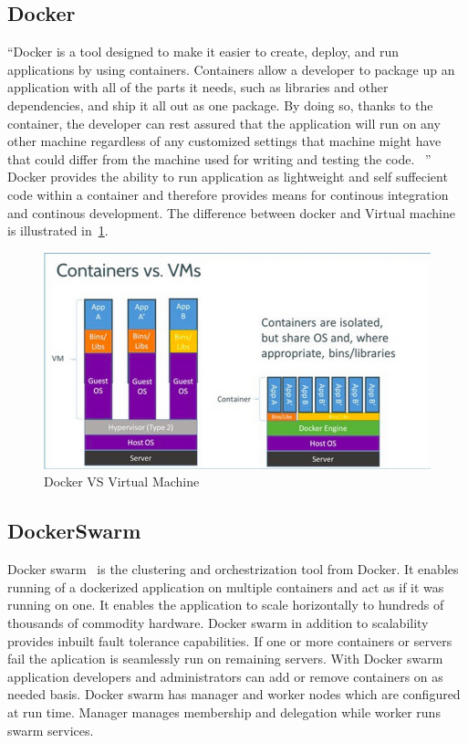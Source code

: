 \subsection{Docker}

``Docker is a tool designed to make it easier to create, deploy, and
run applications by using containers. Containers allow a developer to
package up an application with all of the parts it needs, such as
libraries and other dependencies, and ship it all out as one
package. By doing so, thanks to the container, the developer can rest
assured that the application will run on any other machine regardless
of any customized settings that machine might have that could differ
from the machine used for writing and testing the
code. ~\cite{hid-sp18-413-docker}'' Docker provides the ability to run
application as lightweight and self suffecient code within a container
and therefore provides means for continous integration and continous
development. The difference between docker and Virtual machine is
illustrated in~\ref{f:contvsvm}.

\begin{figure}[!ht]
	\centering\includegraphics[width=\columnwidth]{images/dockervsvm.png}
	 \caption{Docker VS Virtual Machine}\label{f:contvsvm}
\end{figure}

\subsection{DockerSwarm}

Docker swarm~\cite{hid-sp18-413-dockerswarm} is the clustering and
orchestrization tool from Docker. It enables running of a dockerized
application on multiple containers and act as if it was running on
one. It enables the application to scale horizontally to hundreds of
thousands of commodity hardware. Docker swarm in addition to
scalability provides inbuilt fault tolerance capabilities. If one or
more containers or servers fail the aplication is seamlessly run on
remaining servers. With Docker swarm application developers and
administrators can add or remove containers on as needed basis. Docker
swarm has manager and worker nodes which are configured at run
time. Manager manages membership and delegation while worker runs
swarm services.

